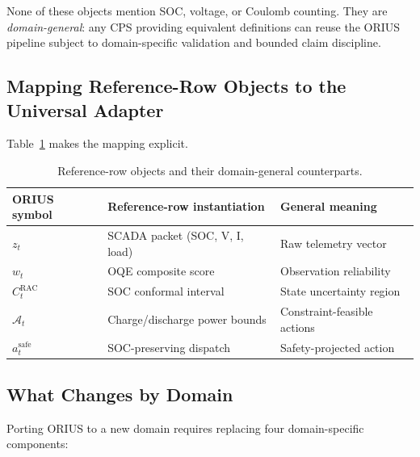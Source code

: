 None of these objects mention SOC, voltage, or Coulomb counting.  They are
\emph{domain-general}: any CPS providing equivalent definitions can reuse
the ORIUS pipeline subject to domain-specific validation and bounded
claim discipline.

\subsection{Mapping Reference-Row Objects to the Universal Adapter}

Table~\ref{tab:domain-mapping} makes the mapping explicit.

\begin{table}[ht]
\centering
\caption{Reference-row objects and their domain-general counterparts.}
\label{tab:domain-mapping}
\begin{tabular}{lll}
\toprule
\textbf{ORIUS symbol} & \textbf{Reference-row instantiation} & \textbf{General meaning} \\
\midrule
$z_t$                  & SCADA packet (SOC, V, I, load) & Raw telemetry vector \\
$w_t$                  & OQE composite score            & Observation reliability \\
$C_t^{\text{RAC}}$     & SOC conformal interval          & State uncertainty region \\
$\mathcal{A}_t$        & Charge/discharge power bounds   & Constraint-feasible actions \\
$a_t^{\text{safe}}$    & SOC-preserving dispatch          & Safety-projected action \\
\bottomrule
\end{tabular}
\end{table}

\subsection{What Changes by Domain}

Porting ORIUS to a new domain requires replacing four domain-specific
components:

